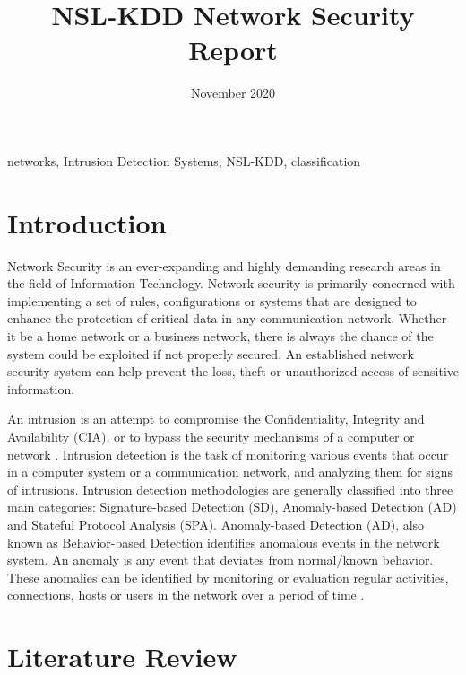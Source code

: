 \documentclass[conference]{IEEEtran}
\title{NSL-KDD Network Security Report}
\author{\IEEEauthorblockN{Rojina Deuja}
\IEEEauthorblockA{\textit{Department of Computer Science and Engineering} \\
\textit{University of Nebraska-Lincoln}\\
Lincoln, United States \\
rojinadeuja33g@gmail.com}}
\date{November 2020}
\begin{document}
\maketitle

\begin{abstract}
\end{abstract}

\begin{IEEEkeywords}
networks, Intrusion Detection Systems, NSL-KDD, classification
\end{IEEEkeywords}

\section{Introduction}
Network Security is an ever-expanding and highly demanding research areas in the field of Information Technology. Network security is primarily concerned with implementing a set of rules, configurations or systems that are designed to enhance the protection of critical data in any communication network. Whether it be a home network or a business network, there is always the chance of the system could be exploited if not properly secured. An established network security system can help prevent the loss, theft or unauthorized access of sensitive information.

An intrusion is an attempt to compromise the Confidentiality, Integrity and Availability (CIA), or to bypass the security mechanisms of a computer or network \cite{b1}. Intrusion detection is the task of monitoring various events that occur in a computer system or a communication network, and analyzing them for signs of intrusions. Intrusion detection methodologies are generally classified into three main categories: Signature-based Detection (SD), Anomaly-based Detection (AD) and Stateful Protocol Analysis (SPA). Anomaly-based Detection (AD), also known as Behavior-based Detection identifies anomalous events in the network system. An anomaly is any event that deviates from normal/known behavior. These anomalies can be identified by monitoring or evaluation regular activities, connections, hosts or users in the network over a period of time \cite{b2}.

\section{Literature Review}
\end{document}
